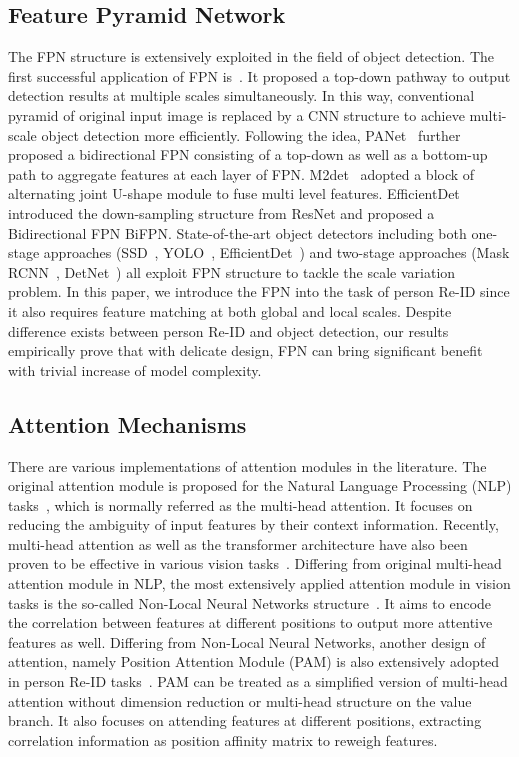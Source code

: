 \documentclass[journal]{IEEEtran}
\begin{document}
\subsection{Feature Pyramid Network}
The FPN structure is extensively exploited in the field of object detection.
The first successful application of FPN is~\cite{8099589}.
It proposed a top-down pathway to output detection results at multiple scales simultaneously.
In this way, conventional pyramid of original input image is replaced by a CNN structure to achieve multi-scale object detection more efficiently.
Following the idea, PANet~\cite{8579011} further proposed a bidirectional FPN consisting of a top-down as well as a bottom-up path to aggregate features at each layer of FPN.
M2det~\cite{zhao2019m2det} adopted a block of alternating joint U-shape module to fuse multi level features.
EfficientDet~\cite{9156454} introduced the down-sampling structure from ResNet and proposed a Bidirectional FPN BiFPN.
State-of-the-art object detectors including both one-stage approaches (SSD~\cite{978-3-319-46448-02}, YOLO~\cite{bochkovskiy2020yolov4}, EfficientDet~\cite{9156454}) and two-stage approaches (Mask RCNN~\cite{he2017mask}, DetNet~\cite{Li_2018_ECCV}) all exploit FPN structure to tackle the scale variation problem. 
In this paper, we introduce the FPN into the task of person Re-ID since it also requires feature matching at both global and local scales.
Despite difference exists between person Re-ID and object detection, our results empirically prove that with delicate design, FPN can bring significant benefit with trivial increase of model complexity.

\subsection{Attention Mechanisms}
There are various implementations of attention modules in the literature.
The original attention module is proposed for the Natural Language Processing (NLP) tasks~\cite{bahdanau2014neural,vaswani2017attention}, which is normally referred as the multi-head attention.
It focuses on reducing the ambiguity of input features by their context information.
Recently, multi-head attention as well as the transformer architecture have also been proven to be effective in various vision tasks~\cite{dosovitskiy2020image}.
Differing from original multi-head attention module in NLP, the most extensively applied attention module in vision tasks is the so-called Non-Local Neural Networks structure~\cite{8578911}.
It aims to encode the correlation between features at different positions to output more attentive features as well.
Differing from Non-Local Neural Networks, another design of attention, namely Position Attention Module (PAM) is also extensively adopted in person Re-ID tasks~\cite{chen2019ABD}.
PAM can be treated as a simplified version of multi-head attention without dimension reduction or multi-head structure on the value branch.
It also focuses on attending features at different positions, extracting correlation information as position affinity matrix to reweigh features.
\end{document}
